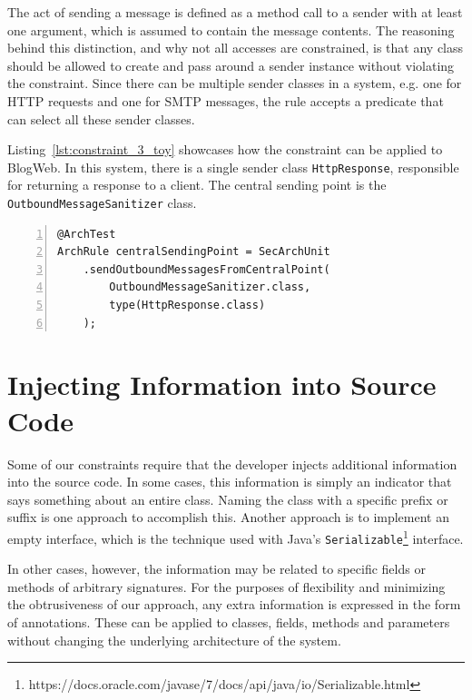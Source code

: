 The act of sending a message is defined as a method call to a sender with at least one argument, which is assumed to contain the message contents. The reasoning behind this distinction, and why not all accesses are constrained, is that any class should be allowed to create and pass around a sender instance without violating the constraint.
Since there can be multiple sender classes in a system, e.g. one for HTTP requests and one for SMTP messages, the rule accepts a predicate that can select all these sender classes.

Listing~\ref{lst:constraint_3_toy} showcases how the constraint can be applied to BlogWeb. In this system, there is a single sender class \texttt{HttpResponse}, responsible for returning a response to a client. The central sending point is the \texttt{OutboundMessageSanitizer} class. 

\begin{minipage}{\linewidth}
\begin{lstlisting}[caption={Application of constraint 3 to BlogWeb.}, captionpos=b, label=lst:constraint_3_toy, numbers=left]
@ArchTest
ArchRule centralSendingPoint = SecArchUnit
    .sendOutboundMessagesFromCentralPoint(
        OutboundMessageSanitizer.class,
        type(HttpResponse.class)
    );
\end{lstlisting}
\end{minipage}




\section{Injecting Information into Source Code}

Some of our constraints require that the developer injects additional information into the source code. In some cases, this information is simply an indicator that says something about an entire class. Naming the class with a specific prefix or suffix is one approach to accomplish this. Another approach is to implement an empty interface, which is the technique used with Java's \texttt{Serializable}\footnote{https://docs.oracle.com/javase/7/docs/api/java/io/Serializable.html} interface. 

In other cases, however, the information may be related to specific fields or methods of arbitrary signatures. For the purposes of flexibility and minimizing the obtrusiveness of our approach, any extra information is expressed in the form of annotations. These can be applied to classes, fields, methods and parameters without changing the underlying architecture of the system.

